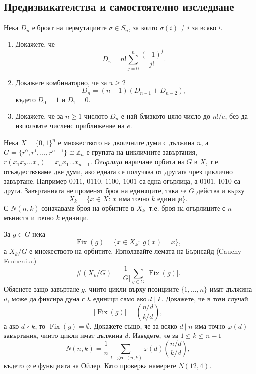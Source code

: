 \documentclass[11pt,a4paper]{article}
\newenvironment{enumeratea}{\begin{enumerate}[label=(\alph*),itemsep=0.28em,topsep=0.25em]}{\end{enumerate}}
\newcounter{problem}[section]
\begin{document}
\subsection*{Предизвикателства и самостоятелно изследване}

\begin{problemstar}[Derangements]
Нека $D_n$ е броят на пермутациите $\sigma\in S_n$, за които
$\sigma(i)\ne i$ за всяко $i$.
\begin{enumeratea}
  \item Докажете, че
  \[
  D_n=n!\sum_{j=0}^{n}\frac{(-1)^j}{j!}.
  \]
  \item Докажете комбинаторно, че за $n\ge 2$
  \[
  D_n=(n-1)(D_{n-1}+D_{n-2}),
  \]
  където $D_0=1$ и $D_1=0$.
  \item Докажете, че за $n\ge 1$ числото $D_n$ е най-близкото цяло число до
  $n!/e$, без да използвате числено приближение на $e$.
\end{enumeratea}
\end{problemstar}

\begin{problemstar}
Нека $X=\{0,1\}^n$ е множеството на двоичните думи с дължина $n$, а
$G=\{r^0,r^1,\dots,r^{n-1}\}\cong\mathbb Z_n$ е групата на цикличните
завъртания, $r(x_1x_2\dots x_n)=x_nx_1\dots x_{n-1}$. \emph{Огърлица}
наричаме орбита на $G$ в $X$, т.е. отъждествяваме две думи, ако едната се
получава от другата чрез циклично завъртане. Например
$0011,\,0110,\,1100,\,1001$ са една огърлица, а $0101,\,1010$ са друга.
Завъртанията не променят броя на единиците, така че $G$ действа и върху
\[
X_k=\{x\in X:\ x\text{ има точно }k\text{ единици}\}.
\]
С $N(n,k)$ означаваме броя на орбитите в $X_k$, т.е. броя на огърлиците с
$n$ мъниста и точно $k$ единици.

За $g\in G$ нека
\[
\operatorname{Fix}(g)=\{x\in X_k:\ g(x)=x\},
\]
а $X_k/G$ е множеството на орбитите. Използвайте лемата на Бърнсайд
(Cauchy--Frobenius)
\[
\#(X_k/G)=\frac1{|G|}\sum_{g\in G}|\operatorname{Fix}(g)|.
\]
Обяснете защо завъртане $g$, чиито цикли върху позициите
$\{1,\dots,n\}$ имат дължина $d$, може да фиксира дума с $k$ единици
само ако $d\mid k$. Докажете, че в този случай
\[
|\operatorname{Fix}(g)|=\binom{n/d}{k/d},
\]
а ако $d\nmid k$, то $\operatorname{Fix}(g)=\emptyset$. Докажете също,
че за всяко $d\mid n$ има точно $\varphi(d)$ завъртания, чиито цикли имат
дължина $d$. Изведете, че за $1\le k\le n-1$
\[
N(n,k)=\frac1n\sum_{d\mid\gcd(n,k)}\varphi(d)\binom{n/d}{k/d},
\]
където $\varphi$ е функцията на Ойлер. Като проверка намерете $N(12,4)$.
\end{problemstar}
\end{document}
